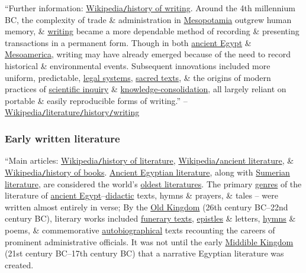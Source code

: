 \documentclass[oneside]{book}
\numberwithin{equation}{section}
\begin{document}
``Further information: \href{https://en.wikipedia.org/wiki/History_of_writing}{Wikipedia\texttt{/}history of writing}. Around the 4th millennium BC, the complexity of trade \& administration in \href{https://en.wikipedia.org/wiki/Mesopotamia}{Mesopotamia} outgrew human memory, \& \href{https://en.wikipedia.org/wiki/Writing}{writing} became a more dependable method of recording \& presenting transactions in a permanent form. Though in both \href{https://en.wikipedia.org/wiki/Ancient_Egypt}{ancient Egypt} \& \href{https://en.wikipedia.org/wiki/Mesoamerica}{Mesoamerica}, writing may have already emerged because of the need to record historical \& environmental events. Subsequent innovations included more uniform, predictable, \href{https://en.wikipedia.org/wiki/List_of_national_legal_systems}{legal systems}, \href{https://en.wikipedia.org/wiki/Religious_text}{sacred texts}, \& the origins of modern practices of \href{https://en.wikipedia.org/wiki/Models_of_scientific_inquiry}{scientific inquiry} \& \href{https://en.wikipedia.org/wiki/Knowledge_management}{knowledge-consolidation}, all largely reliant on portable \& easily reproducible forms of writing.'' -- \href{https://en.wikipedia.org/wiki/Literature#Writing}{Wikipedia\texttt{/}literature\texttt{/}history\texttt{/}writing}

\subsubsection{Early written literature}
``Main articles: \href{https://en.wikipedia.org/wiki/History_of_literature}{Wikipedia\texttt{/}history of literature}, \href{https://en.wikipedia.org/wiki/Ancient_literature}{Wikipedia\texttt{/}ancient literature}, \& \href{https://en.wikipedia.org/wiki/History_of_books}{Wikipedia\texttt{/}history of books}. \href{https://en.wikipedia.org/wiki/Ancient_Egyptian_literature}{Ancient Egyptian literature}, along with \href{https://en.wikipedia.org/wiki/Sumerian_literature}{Sumerian literature}, are considered the world's \href{https://en.wikipedia.org/wiki/Ancient_literature}{oldest literatures}. The primary \href{https://en.wikipedia.org/wiki/Genre}{genres} of the literature of \href{https://en.wikipedia.org/wiki/Ancient_Egypt}{ancient Egypt}--\href{https://en.wikipedia.org/wiki/Didacticism}{didactic} texts, hymns \& prayers, \& tales -- were written almost entirely in verse; By the \href{https://en.wikipedia.org/wiki/Old_Kingdom}{Old Kingdom} (26th century BC--22nd century BC), literary works included \href{https://en.wikipedia.org/wiki/Ancient_Egyptian_funerary_texts}{funerary texts}, \href{https://en.wikipedia.org/wiki/Epistle}{epistles} \& letters, \href{https://en.wikipedia.org/wiki/Hymns}{hymns} \& poems, \& commemorative \href{https://en.wikipedia.org/wiki/Autobiography}{autobiographical} texts recounting the careers of prominent administrative officials. It was not until the early \href{https://en.wikipedia.org/wiki/Middle_Kingdom_of_Egypt}{Middible Kingdom} (21st century BC--17th century BC) that a narrative Egyptian literature was created.
\end{document}
